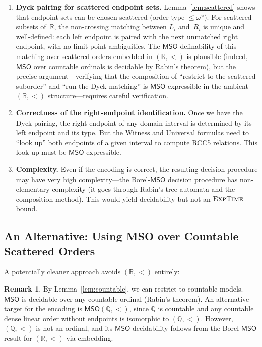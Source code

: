 \documentclass[a4paper,11pt]{article}
\theoremstyle{definition}
\newtheorem{remark}[theorem]{Remark}
\newcommand{\EXPTIME}{\textsc{ExpTime}}
\newcommand{\MSO}{\ensuremath{\mathsf{MSO}}}
\newcommand{\reals}{\ensuremath{\mathbb{R}}}
\begin{document}
\begin{enumerate}[nosep]
  \item \textbf{Dyck pairing for scattered endpoint sets.}\;
    Lemma~\ref{lem:scattered} shows that endpoint sets can be chosen
    scattered (order type $\leq \omega^\omega$).  For scattered
    subsets of~$\reals$, the non-crossing matching between $L_i$
    and~$R_i$ is unique and well-defined: each left endpoint is
    paired with the next unmatched right endpoint, with no limit-point
    ambiguities.  The $\MSO$-definability of this matching over
    scattered orders embedded in $(\reals, <)$ is plausible (indeed,
    $\MSO$ over countable ordinals is decidable by Rabin's theorem),
    but the precise argument---verifying that the composition of
    ``restrict to the scattered suborder'' and ``run the Dyck
    matching'' is $\MSO$-expressible in the ambient $(\reals, <)$
    structure---requires careful verification.

  \item \textbf{Correctness of the right-endpoint identification.}\;
    Once we have the Dyck pairing, the right endpoint of any domain interval
    is determined by its left endpoint and its type.  But the
    $\mathrm{Witness}$ and $\mathrm{Universal}$ formulas need to
    ``look up'' both endpoints of a given interval to compute RCC5
    relations.  This look-up must be $\MSO$-expressible.

  \item \textbf{Complexity.}\;  Even if the encoding is correct,
    the resulting decision procedure may have very high
    complexity---the Borel-$\MSO$ decision procedure has
    non-elementary complexity (it goes through Rabin's tree automata
    and the composition method).  This would yield decidability but
    not an $\EXPTIME$ bound.
\end{enumerate}

\subsection{An Alternative: Using MSO over Countable Scattered Orders}

A potentially cleaner approach avoids $(\reals, <)$ entirely:

\begin{remark}
By Lemma~\ref{lem:countable}, we can restrict to countable models.
$\MSO$ is decidable over any countable ordinal (Rabin's theorem).
An alternative target for the encoding is $\MSO(\mathbb{Q}, <)$,
since $\mathbb{Q}$ is countable and any countable dense linear order
without endpoints is isomorphic to $(\mathbb{Q}, <)$.  However,
$(\mathbb{Q}, <)$ is not an ordinal, and its $\MSO$-decidability
follows from the Borel-$\MSO$ result for $(\reals, <)$
\cite{Manthe2024} via embedding.
\end{remark}
\end{document}
